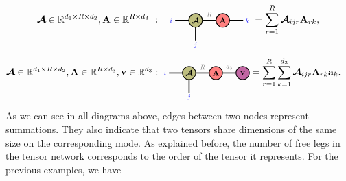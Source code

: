 \begin{align}\label{eq:tenmat}
\At\in\RR^{d_1\times R\times d_2},\Ab\in\RR^{R\times d_3}\ :\ \
\begin{tikzpicture}[baseline = \baseline]
    \tikzset{tensor/.style = {minimum size = 0.5cm,shape = circle,thick,draw=black,inner sep = 0pt}, edge/.style = {thick,line width=.4mm},every loop/.style={}}
    \def\y{0}
    \def\x{0}
    \node[tensor,fill=green!50!red!50!white] (At) at (\x,\y){\scalebox{0.85}{$\At$}};
    \node[tensor,fill=red!50!white] (A) at (\x+1,\y){\scalebox{0.85}{$\Ab$}};
    \draw[edge] (At) -- (A) node [above,midway] {\scalebox{0.7}{\dimcolor{$R$}}};
    \draw[edge] (\x-0.25,\y) -- (\x-0.75,\y)  node [pos=1.3] {\scalebox{0.7}{\indcolor{$i$}}};
    \draw[edge] (\x,\y-0.25) -- (\x,\y-0.75)  node [pos=1.3] {\scalebox{0.7}{\indcolor{$j$}}};
    \draw[edge] (\x+1.25,\y) -- (\x+1.75,\y)  node [pos=1.3] {\scalebox{0.7}{\indcolor{$k$}}};
\end{tikzpicture} 
= \sum_{r=1}^R\At_{ijr}\Ab_{rk},
\end{align}
\begin{align}\label{eq:tenmatvec}
\At\in\RR^{d_1\times R\times d_2},\Ab\in\RR^{R\times d_3}, \vb\in\RR^{d_3}&:
   \begin{tikzpicture}[baseline = \baseline]
    \tikzset{tensor/.style = {minimum size = 0.5cm,shape = circle,thick,draw=black,inner sep = 0pt}, edge/.style = {thick,line width=.4mm},every loop/.style={}}
    \def\y{0}
    \def\x{0}
    \node[tensor,fill=green!50!red!50!white] (At) at (\x,\y){\scalebox{0.85}{$\At$}};
    \node[tensor,fill=red!50!white] (A) at (\x+1,\y){\scalebox{0.85}{$\Ab$}};
    \node[tensor,fill=blue!40!red!60!white] (a) at (\x+2,\y){\scalebox{0.85}{$\vb$}};
    \draw[edge] (At) -- (A) node [above,midway] {\scalebox{0.7}{\dimcolor{$R$}}};
    \draw[edge] (A) -- (a) node [above,midway] {\scalebox{0.7}{\dimcolor{$d_3$}}};
    \draw[edge] (\x-0.25,\y) -- (\x-0.75,\y)  node [pos=1.3] {\scalebox{0.7}{\indcolor{$i$}}};
    \draw[edge] (\x,\y-0.25) -- (\x,\y-0.75)  node [pos=1.3] {\scalebox{0.7}{\indcolor{$j$}}};
    \end{tikzpicture} 
= \sum_{r=1}^R\sum_{k=1}^{d_3}\At_{ijr}\Ab_{rk}\ab_{k}.
\end{align}
As we can see in all diagrams above, edges between two nodes represent summations. They also indicate that two tensors share dimensions of the same size on the corresponding mode. 
As explained before, the number of free legs in the tensor network corresponds to the order of the tensor it represents. For the previous examples, we have

